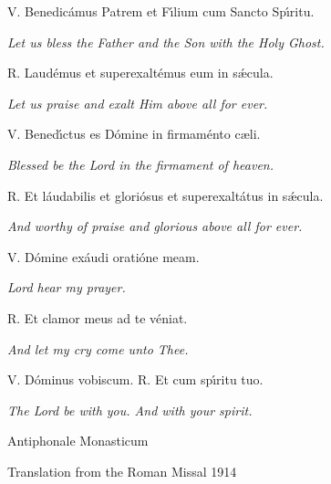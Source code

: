 \bigskip

\s V. Benedic\'amus Patrem et F\'\i lium cum Sancto Sp\'\i ritu.

{\hskip5mm \it Let us bless the Father and the Son with the Holy Ghost.}

\s R. Laud\'emus et superexalt\'emus eum in s\'\ae cula.

{\hskip15mm \it Let us praise and exalt Him above all for ever.}

\s V. Bened\'\i ctus es D\'omine in firmam\'ento c\ae li.

{\hskip15mm \it Blessed be the Lord in the firmament of heaven.}

\s R. Et l\'audabilis et glori\'osus et superexalt\'atus in s\'\ae cula.

{\hskip15mm \it And worthy of praise and glorious above all for ever.}

\s V. D\'omine ex\'audi orati\'one meam.

{\hskip15mm \it Lord hear my prayer.}

\s R. Et clamor meus ad te v\'eniat.

{\hskip15mm \it And let my cry come unto Thee.}

\s V. D\'ominus vobiscum. \s R. Et cum sp\'\i ritu tuo.

{\hskip15mm \it The Lord be with you.  And with your spirit.}

\bigskip

\source Antiphonale Monasticum

\source Translation from the Roman Missal 1914


